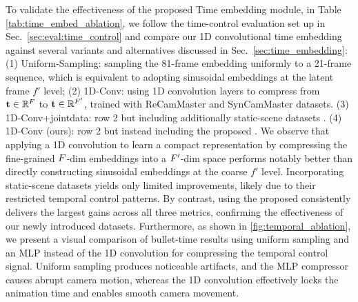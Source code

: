 \label{sec:time_embedding_ablation}
To validate the effectiveness of the proposed Time embedding module, in Table \ref{tab:time_embed_ablation}, we follow the time-control evaluation set up in Sec.~\ref{sec:eval:time_control} and compare our 1D convolutional time embedding against several variants and alternatives discussed in Sec.~\ref{sec:time_embedding}:
(1) Uniform-Sampling: sampling the 81-frame embedding uniformly to a 21-frame sequence, which is equivalent to adopting sinusoidal embeddings at the latent frame $f'$ level;
(2) 1D-Conv: using 1D convolution layers to compress from $\mathbf{t} \in \mathbb{R}^F$ to $\mathbf{t} \in \mathbb{R}^{F'}$, trained with ReCamMaster and SynCamMaster datasets.
(3) 1D-Conv+jointdata: row 2 but including additionally static-scene datasets \cite{zhou2018stereo,li2019mannequin}.
(4) 1D-Conv (ours): row 2 but instead including the proposed \nameDataset.  
We observe that applying a 1D convolution to learn a compact representation by compressing the fine-grained $F$-dim embeddings into a $F'$-dim space performs notably better than directly constructing sinusoidal embeddings at the coarse $f'$ level.
Incorporating static-scene datasets yields only limited improvements, likely due to their restricted temporal control patterns.
By contrast, using the proposed \nameDataset consistently delivers the largest gains across all three metrics, confirming the effectiveness of our newly introduced datasets.
Furthermore, as shown in \cref{fig:temporal_ablation}, we present a visual comparison of bullet-time results using uniform sampling and an MLP instead of the 1D convolution for compressing the temporal control signal.
Uniform sampling produces noticeable artifacts, and the MLP compressor causes abrupt camera motion, whereas the 1D convolution effectively locks the animation time and enables smooth camera movement.













